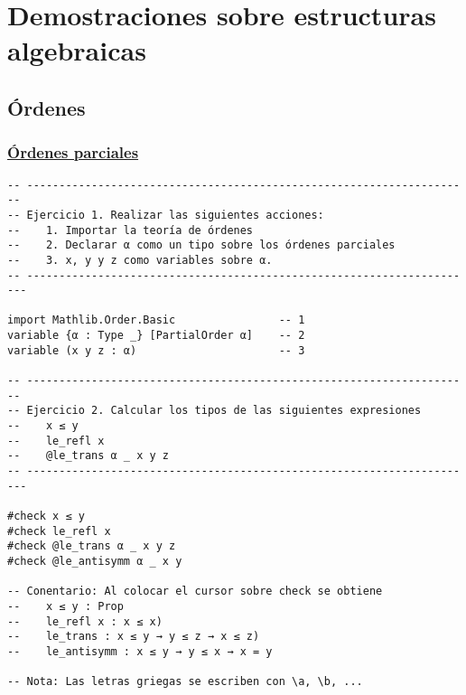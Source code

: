 \section{Demostraciones sobre estructuras algebraicas}
\label{sec:orge5b216c}

\subsection{Órdenes}
\label{sec:org1746c87}

\subsubsection{\href{./src/Basicos/Ordenes\_parciales.lean}{Órdenes parciales}}
\label{sec:org4b37aa5}
\begin{verbatim}
-- ---------------------------------------------------------------------
-- Ejercicio 1. Realizar las siguientes acciones:
--    1. Importar la teoría de órdenes
--    2. Declarar α como un tipo sobre los órdenes parciales
--    3. x, y y z como variables sobre α.
-- ----------------------------------------------------------------------

import Mathlib.Order.Basic                -- 1
variable {α : Type _} [PartialOrder α]    -- 2
variable (x y z : α)                      -- 3

-- ---------------------------------------------------------------------
-- Ejercicio 2. Calcular los tipos de las siguientes expresiones
--    x ≤ y
--    le_refl x
--    @le_trans α _ x y z
-- ----------------------------------------------------------------------

#check x ≤ y
#check le_refl x
#check @le_trans α _ x y z
#check @le_antisymm α _ x y

-- Conentario: Al colocar el cursor sobre check se obtiene
--    x ≤ y : Prop
--    le_refl x : x ≤ x)
--    le_trans : x ≤ y → y ≤ z → x ≤ z)
--    le_antisymm : x ≤ y → y ≤ x → x = y

-- Nota: Las letras griegas se escriben con \a, \b, ...
\end{verbatim}

